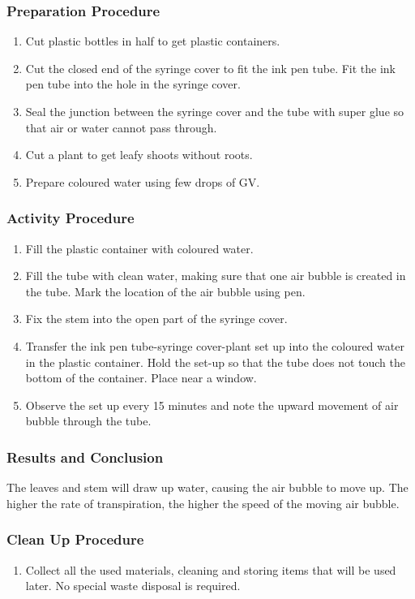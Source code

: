 \subsubsection*{Preparation Procedure}
\begin{enumerate}
\item{Cut plastic bottles in half to get plastic containers.}
\item{Cut the closed end of the syringe cover to fit the ink pen tube. Fit the ink pen tube into the hole in the syringe cover.}
\item{Seal the junction between the syringe cover and the tube with super glue so that air or water cannot pass through.}
\item{Cut a plant to get leafy shoots without roots.}
\item{Prepare coloured water using few drops of GV.}
\end{enumerate}

\subsubsection*{Activity Procedure}
\begin{enumerate}
\item{Fill the plastic container with coloured water.}
\item{Fill the tube with clean water, making sure that one air bubble is created in the tube. Mark the location of the air bubble using pen.}
\item{Fix the stem into the open part of the syringe cover.}
\item{Transfer the ink pen tube-syringe cover-plant set up into the coloured water in the plastic container. Hold the set-up so that the tube does not touch the bottom of the container. Place near a window.}
\item{Observe the set up every 15 minutes and note the upward movement of air bubble through the tube.}
\end{enumerate}

\subsubsection*{Results and Conclusion}
The leaves and stem will draw up water, causing the air bubble to move up. The higher the rate of transpiration, the higher the speed of the moving air bubble.

\subsubsection*{Clean Up Procedure}
\begin{enumerate}
\item{Collect all the used materials, cleaning and storing items that will be used later. No special waste disposal is required.}
\end{enumerate}

